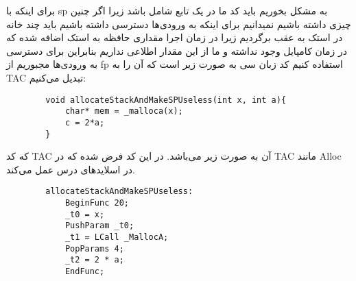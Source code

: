 
برای اینکه با sp به مشکل بخوریم باید کد ما در یک تابع شامل  باشد زیرا اگر چنین چیزی داشته باشیم نمیدانیم برای اینکه به ورودی‌ها دسترسی داشته باشیم باید چند خانه در استک به عقب برگردیم زیرا در زمان اجرا مقداری حافظه به استک اضافه شده که در زمان کامپایل وجود نداشته و ما از این مقدار اطلاعی نداریم بنابراین برای دسترسی به ورودی‌ها مجبوریم از fp استفاده کنیم کد زبان سی به صورت زیر است که آن را به TAC تبدیل می‌کنیم:
\begin{latin}
	\begin{verbatim}
		void allocateStackAndMakeSPUseless(int x, int a){
		    char* mem = _malloca(x);
		    c = 2*a;
		}
	\end{verbatim}
\end{latin}
که کد TAC آن به صورت زیر می‌باشد. در این کد فرض شده که  در TAC مانند Alloc در اسلاید‌های درس عمل می‌کند.
\begin{latin}
	\begin{verbatim}
		allocateStackAndMakeSPUseless:
		    BeginFunc 20;
		    _t0 = x;
		    PushParam _t0;
		    _t1 = LCall _MallocA;
		    PopParams 4;
		    _t2 = 2 * a;
		    EndFunc;
			
	\end{verbatim}
\end{latin}

